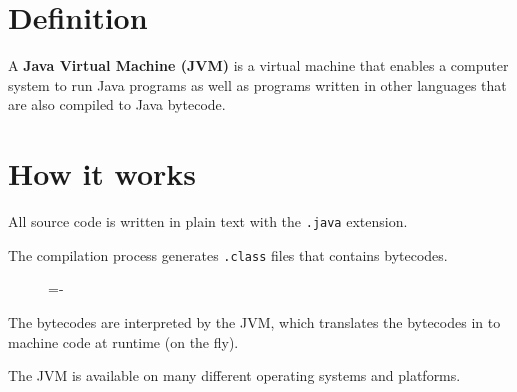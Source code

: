 \documentclass[a4paper]{systems-software}
\begin{document}
\section*{Definition}

A \textbf{Java Virtual Machine (JVM)} is a virtual machine that enables a computer system to run Java programs as well as programs written in other languages that are also compiled to Java bytecode. 


\section*{How it works}

All source code is written in plain text with the \texttt{.java} extension.

The compilation process generates \texttt{.class} files that contains bytecodes.

\begin{figure}[H]
  \lineskip=-\fboxrule
\end{figure}

The bytecodes are interpreted by the JVM, which translates the bytecodes in to machine code at runtime (on the fly).

The JVM is available on many different operating systems and platforms.
\end{document}
